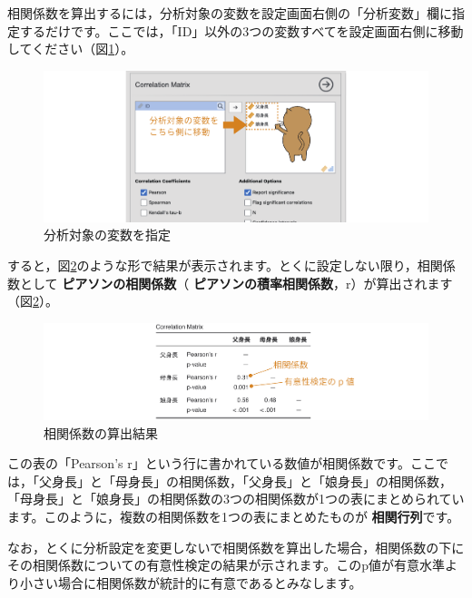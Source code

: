 \documentclass[
  12pt,
  a5jpaper,
  lualatex, ja=standard]{bxjsbook}
\renewcommand{\emph}[1]{\textbf{\color{emph} #1}}
\begin{document}
相関係数を算出するには，分析対象の変数を設定画面右側の「分析変数」欄に指定するだけです。ここでは，「ID」以外の3つの変数すべてを設定画面右側に移動してください（図\ref{fig:regression-correlation-var}）。

\begin{figure}[!ht]

{\centering \includegraphics[width=1\linewidth]{images/regression/correlation-var} 

}

\caption{分析対象の変数を指定}\label{fig:regression-correlation-var}
\end{figure}

すると，図\ref{fig:regression-cormat}のような形で結果が表示されます。とくに設定しない限り，相関係数として\emph{ピアソンの相関係数}（\emph{ピアソンの積率相関係数}，r）が算出されます（図\ref{fig:regression-cormat}）。

\begin{figure}[!ht]

{\centering \includegraphics[width=1\linewidth]{images/regression/cormat} 

}

\caption{相関係数の算出結果}\label{fig:regression-cormat}
\end{figure}

この表の「Pearson's r」という行に書かれている数値が相関係数です。ここでは，「父身長」と「母身長」の相関係数，「父身長」と「娘身長」の相関係数，「母身長」と「娘身長」の相関係数の3つの相関係数が1つの表にまとめられています。このように，複数の相関係数を1つの表にまとめたものが\emph{相関行列}です。

なお，とくに分析設定を変更しないで相関係数を算出した場合，相関係数の下にその相関係数についての有意性検定の結果が示されます。このp値が有意水準より小さい場合に相関係数が統計的に有意であるとみなします。
\end{document}
